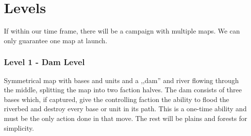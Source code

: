 \part{Levels}

If within our time frame, there will be a campaign with multiple maps. We can only guarantee one map at launch.
\section{Level 1 - Dam Level}
\label{level}
Symmetrical map with bases and units and a ,,dam'' and river flowing through the middle, splitting the map into two faction halves.
The dam consists of three bases which, if captured, give the controlling faction the ability to flood the riverbed and destroy every base
or unit in its path. This is a one-time ability and must be the only action done in that move. The rest will be plains and forests for simplicity.
